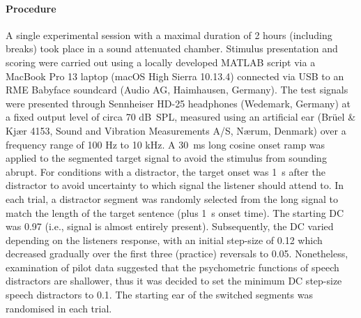 \documentclass[a4paper, twoside]{templates/ociamthesis}
\begin{document}
\hypertarget{procedure}{%
\paragraph{Procedure}\label{procedure}}

\hfill\break
A single experimental session with a maximal duration of 2 hours (including breaks) took place in a sound attenuated chamber. Stimulus presentation and scoring were carried out using a locally developed MATLAB script via a MacBook Pro 13 laptop (macOS High Sierra 10.13.4) connected via USB to an RME Babyface soundcard (Audio AG, Haimhausen, Germany). The test signals were presented through Sennheiser HD-25 headphones (Wedemark, Germany) at a fixed output level of circa 70 dB~SPL, measured using an artificial ear (Brüel \& Kjær 4153, Sound and Vibration Measurements A/S, Nærum, Denmark) over a frequency range of 100 Hz to 10 kHz. A 30~ms long cosine onset ramp was applied to the segmented target signal to avoid the stimulus from sounding abrupt. For conditions with a distractor, the target onset was 1~s after the distractor to avoid uncertainty to which signal the listener should attend to. In each trial, a distractor segment was randomly selected from the long signal to match the length of the target sentence (plus 1~s onset time). The starting DC was 0.97 (i.e., signal is almost entirely present). Subsequently, the DC varied depending on the listeners response, with an initial step-size of 0.12 which decreased gradually over the first three (practice) reversals to 0.05. Nonetheless, examination of pilot data suggested that the psychometric functions of speech distractors are shallower, thus it was decided to set the minimum DC step-size speech distractors to 0.1. The starting ear of the switched segments was randomised in each trial.\\
\end{document}
